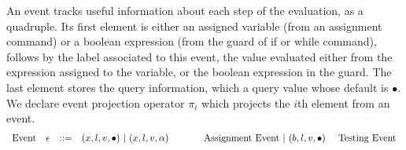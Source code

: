 An event tracks useful information about each step of the evaluation, as a quadruple. Its first element is either 
an assigned variable (from an assignment command) or a boolean expression (from the guard of if or while command), follows by 
 the label associated to this event, the value evaluated either from the expression assigned to the variable,
or the boolean expression in the guard.
 The last element stores the query information, which a query value whose default is $\bullet$. We declare event projection operator $\pi_i$ which projects the $i$th element from an event.
\[
\begin{array}{llll}
\mbox{Event} 
& \mathtt{\epsilon} & ::= & 
    ({x}, l, v, \bullet) ~|~ ({x}, l, v, \alpha)  ~~~~~~~~~~~ \mbox{Assignment Event} 
~|~(b, l, v, \bullet)   
~~~~
\mbox{Testing Event}
\end{array}
\]
% 
